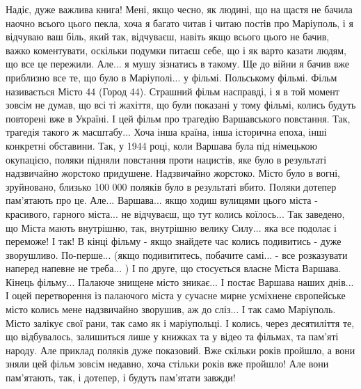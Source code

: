 Надіє, дуже важлива книга! Мені, якщо чесно, як людині, що на щастя не бачила
наочно всього цього пекла, хоча я багато читав і читаю постів про Маріуполь, і
я відчуваю ваш біль, який так, відчуваєш, навіть якщо всього цього не бачив,
важко коментувати, оскільки подумки питаєш себе, що і як варто казати людям, що
все це пережили. Але... я мушу зізнатись в такому. Ще до війни я бачив вже
приблизно все те, що було в Маріуполі... у фільмі. Польському фільмі. Фільм
називається Місто 44 (Город 44). Страшний фільм насправді, і я в той момент
зовсім не думав, що всі ті жахіття, що були показані у тому фільмі, колись
будуть повторені вже в Україні. І цей фільм про трагедію Варшавського
повстання. Так, трагедія такого ж масштабу...  Хоча інша країна, інша історична
епоха, інші конкретні обставини. Так, у 1944 році, коли Варшава була під
німецькою окупацією, поляки підняли повстання проти нацистів, яке було в
результаті надзвичайно жорстоко придушене. Надзвичайно жорстоко. Місто було в
вогні, зруйновано, близько 100 000 поляків було в результаті вбито. Поляки
дотепер пам'ятають про це. Але... Варшава... якщо ходиш вулицями цього міста -
красивого, гарного міста... не відчуваєш, що тут колись коїлось... Так
заведено, що Міста мають внутрішню, так, внутрішню велику Силу... яка все
подолає і переможе! І так! В кінці фільму - якщо знайдете час колись подивитись
- дуже зворушливо. По-перше... (якщо подивититесь, побачите самі... - все
розказувати наперед напевне не треба... )  І по друге, що стосується власне
Міста Варшава. Кінець фільму... Палаюче знищене місто зникає... І постає
Варшава наших днів... І оцей перетворення із палаючого міста у сучасне мирне
усміхнене європейське місто колись мене надзвичайно зворушив, аж до сліз... І
так само Маріуполь. Місто залікує свої рани, так само як і маріупольці. І
колись, через десятиліття те, що відбувалось, залишиться лише у книжках та у
відео та фільмах, та пам'яті народу. Але приклад поляків дуже показовий. Вже
скільки років пройшло, а вони зняли цей фільм зовсім недавно, хоча стільки
років вже пройшло! Але вони пам'ятають, так, і дотепер, і будуть пам'ятати
завжди! 

